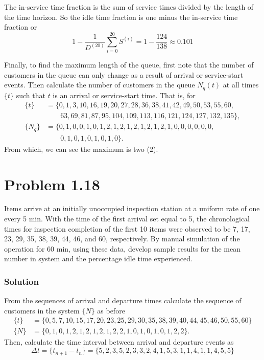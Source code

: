 \documentclass[letterpaper]{amsart}
\begin{document}
The in-service time fraction is the sum of service times divided by the length of the
time horizon. So the idle time fraction is one minus the in-service time
fraction or
\begin{equation*}
  1-\frac{1}{D^{(20)}}\sum_{i=0}^{20}S^{(i)}
  =1- \frac{124}{138}
  \approx 0.101
\end{equation*}

Finally, to find the maximum length of the queue, first note that the number of
customers in the queue can only change as a result of arrival or
service-start events.
Then calculate the number of customers in the queue $N_q(t)$ at all times $\{t\}$
such that $t$ is an arrival or service-start time. That is, for
\begin{align*}
  \{t\}&=\{0, 1, 3, 10, 16, 19, 20, 27, 28, 36, 38, 41, 42, 49, 50, 53, 55, 60, \\
  &\quad\quad 63, 69, 81, 87, 95, 104, 109, 113, 116, 121, 124, 127, 132, 135\}, \\
  \{N_q\} &= \{0, 1, 0, 0, 1, 0, 1, 2, 1, 2, 1, 2, 1, 2, 1, 2, 1, 0, 0, 0, 0, 0, 0,\\
  &\quad\quad 0, 1, 0, 1, 0, 1, 0, 1, 0\}.
\end{align*}
From which, we can see the maximum is two (2).

\section{Problem 1.18} %
Items arrive at an initially unoccupied inspection station at a uniform rate
of one every 5 min. With the time of the first arrival set equal to 5, the
chronological times for inspection completion of the first 10 items were
observed to be 7, 17, 23, 29, 35, 38, 39, 44, 46, and 60, respectively. By
manual simulation of the operation for 60 min, using these data, develop
sample results for the mean number in system and the percentage idle time
experienced.
\subsubsection*{Solution}
From the sequences of arrival and departure times calculate the sequence of
customers in the system $\{N\}$ as before
\begin{align*}
  \{t\}&=\{0, 5, 7, 10, 15, 17, 20, 23, 25, 29, 30, 35, 38, 39, 40, 44, 45, 46, 50, 55, 60\}\\
         \{N\} &= \{0, 1, 0, 1, 2, 1, 2, 1, 2, 1, 2, 2, 1, 0, 1, 0, 1, 0, 1, 2, 2\}.
\end{align*}
Then, calculate the time interval between arrival and departure events as
\begin{equation*}
  \Delta t=\{t_{n+1}-t_{n}\} = \{5, 2, 3, 5, 2, 3, 3, 2, 4, 1, 5, 3, 1, 1, 4, 1, 1, 4, 5, 5\}
\end{equation*}
\end{document}

